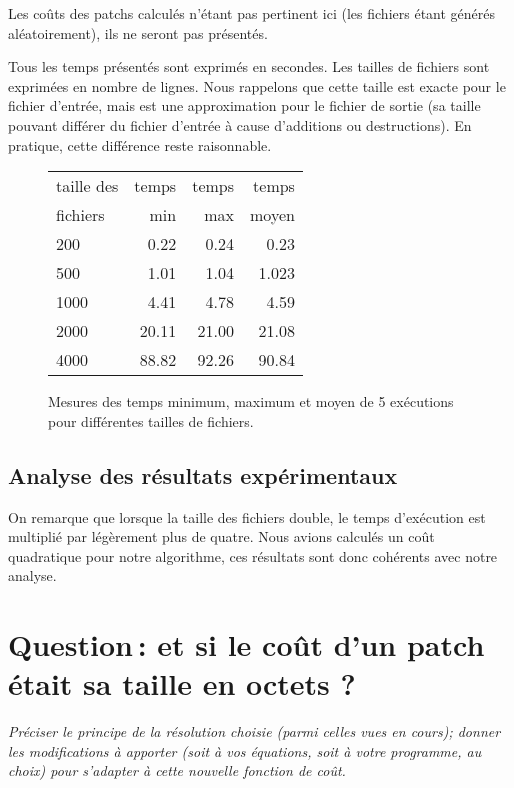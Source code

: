 \documentclass[a4paper, 10pt, french]{article}
\begin{document}
    Les coûts des patchs calculés n'étant pas pertinent ici (les fichiers étant
    générés aléatoirement), ils ne seront pas présentés.

    Tous les temps présentés sont exprimés en secondes. Les tailles de fichiers
    sont exprimées en nombre de lignes. Nous rappelons que cette taille est exacte
    pour le fichier d'entrée, mais est une approximation pour le fichier de sortie
    (sa taille pouvant différer du fichier d'entrée à cause d'additions ou destructions).
    En pratique, cette différence reste raisonnable.

    \begin{figure}[h]
      \begin{center}
        \begin{tabular}{|l||r|r|r||}
          \hline
          \hline
            taille des &   temps     & temps   & temps \\
            fichiers &   min       & max     & moyen \\
          \hline
          \hline
            200 &  0.22      &   0.24  &  0.23   \\
          \hline
            500 &  1.01      &   1.04  &  1.023   \\
          \hline
            1000 &   4.41     &  4.78   &  4.59   \\
          \hline
            2000 & 20.11   &  21.00   &  21.08   \\
          \hline
            4000 & 88.82  &    92.26   &  90.84  \\
          \hline
          \hline
        \end{tabular}
        \caption{Mesures des temps minimum, maximum et moyen de 5 exécutions pour différentes tailles de fichiers.}
        \label{table-temps}
      \end{center}
    \end{figure}

\subsection{Analyse des résultats expérimentaux}
On remarque que lorsque la taille des fichiers double, le temps d'exécution est
multiplié par légèrement plus de quatre. Nous avions calculés un coût quadratique
pour notre algorithme, ces résultats sont donc cohérents avec notre analyse.

\section{Question\,: et  si le coût d'un patch était sa taille en octets ?}
{\em Préciser le principe de la résolution choisie (parmi celles vues en cours); donner  les modifications à apporter (soit à vos  équations, soit à votre programme, au choix)
pour s'adapter à cette nouvelle fonction de coût.
}
\end{document}

